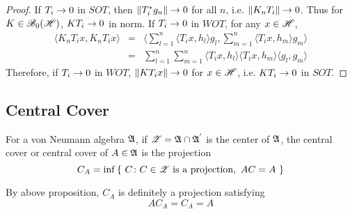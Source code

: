 \begin{proof}
	If $T_i \rightarrow 0$ in $SOT$, then $\left\lVert T_i^{*} g_n\right\lVert \rightarrow 0$ for all $n$, i.e. $\left\lVert K_nT_i\right\lVert \rightarrow 0$. Thus for $K \in \mathscr{B}_{0}\mathscr{(H)}$, $KT_i \rightarrow 0$ in norm. If $T_i \rightarrow 0$ in $WOT$, for any $x \in \mathscr{H}$,
	\begin{eqnarray*}
		\langle K_n T_i x, K_n T_i x \rangle &=& \langle \sum_{l=1}^n \langle T_i x, h_l \rangle g_l, \sum_{m=1}^n \langle T_i x, h_m \rangle g_m \rangle \\
		&=& \sum_{l=1}^n \sum_{m=1}^n \langle T_i x, h_l \rangle \langle T_i x, h_m \rangle \langle g_l, g_m \rangle
	\end{eqnarray*}
	Therefore, if $T_i \rightarrow 0$ in $WOT$, $\left\lVert KT_i x\right\lVert \rightarrow 0$ for $x \in \mathscr{H}$, i.e. $KT_i \rightarrow 0$ in $SOT$.
\end{proof}

\subsection{Central Cover}

\begin{defn}
	For a von Neumann algebra $\mathfrak{A}$, if $\mathscr{Z} = \mathfrak{A} \cap \mathfrak{A}^{'}$ is the center of $\mathfrak{A}$, the central cover or central cover of $A \in \mathfrak{A}$ is the projection
	\begin{equation*}
		C_A = \inf{\{~C \colon C \in \mathscr{Z} \text{ is a projection},~AC = A~\}}
	\end{equation*}
\end{defn}
\begin{rem}
	By above proposition, $C_A$ is definitely a projection satisfying
	\begin{equation*}
		AC_A = C_A = A
	\end{equation*}
\end{rem}

